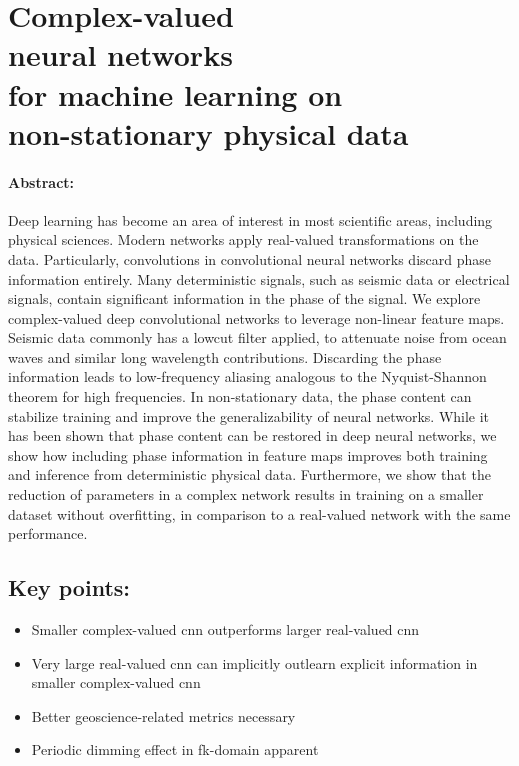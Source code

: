 \section[Complex-valued neural networks for machine learning on non-stationary physical data]{Complex-valued\\neural networks\\for machine learning on\\\hspace*{-2cm}non-stationary physical data}

\paragraph{Abstract:} Deep learning has become an area of interest in most scientific areas, including physical sciences. Modern networks apply real-valued transformations on the data. Particularly, convolutions in convolutional neural networks discard phase information entirely. Many deterministic signals, such as seismic data or electrical signals, contain significant information in the phase of the signal. We explore complex-valued deep convolutional networks to leverage non-linear feature maps. Seismic data commonly has a lowcut filter applied, to attenuate noise from ocean waves and similar long wavelength contributions. Discarding the phase information leads to low-frequency aliasing analogous to the Nyquist-Shannon theorem for high frequencies. In non-stationary data, the phase content can stabilize training and improve the generalizability of neural networks. While it has been shown that phase content can be restored in deep neural networks, we show how including phase information in feature maps improves both training and inference from deterministic physical data. Furthermore, we show that the reduction of parameters in a complex network results in training on a smaller dataset without overfitting, in comparison to a real-valued network with the same performance.

\subsection*{Key points:}
\begin{itemize}
    \item Smaller complex-valued \acl{cnn} outperforms larger real-valued \acl{cnn}
    \item Very large real-valued \ac{cnn} can implicitly outlearn explicit information in smaller complex-valued \ac{cnn}
    \item Better geoscience-related metrics necessary
    \item Periodic dimming effect in \acl{fk}-domain apparent
\end{itemize}

{\vfill\hfill\newline{}}

